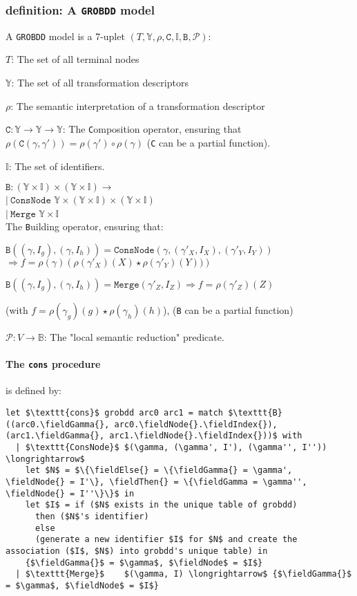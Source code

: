 \documentclass[a4paper,10pt]{article}
\newcommand{\B}{\mathbb{B}}
\newcommand{\Y}{\mathbb{Y}}
\newcommand{\I}{\mathbb{I}}
\newcommand{\GroBdd}{\texttt{GROBDD}}
\newcommand{\fieldIndex}{\texttt{index}}
\newcommand{\fieldNode}{\texttt{node}}
\newcommand{\fieldGamma}{\mathtt{\gamma}}
\newcommand{\fieldThen}{\mathtt{if1}}
\newcommand{\fieldElse}{\mathtt{if0}}
\begin{document}
\subsubsection{definition: A \GroBdd{} model}
{
A \GroBdd{} model is a 7-uplet $(T, \Y, \rho, \texttt{C}, \I, \texttt{B}, \mathcal{P})$:
\begin{compactenum}
\item $T$: The set of all terminal nodes
\item $\Y$: The set of all transformation descriptors
\item $\rho$: The semantic interpretation of a transformation descriptor
\item $\texttt{C}: \Y \longrightarrow \Y \longrightarrow \Y$: The \texttt{C}omposition operator, ensuring that $\rho(\texttt{C}(\gamma, \gamma')) = \rho(\gamma')\circ\rho(\gamma)$ (\texttt{C} can be a partial function).
\item $\I$: The set of identifiers.
\item $\mathtt{B}: (\Y\times\I)\times(\Y\times\I) \longrightarrow$\\
 $|~\texttt{ConsNode}$ $\Y\times (\Y\times\I) \times (\Y\times\I)$\\
 $|~\texttt{Merge}$ $\Y\times\I$\\
The \texttt{B}uilding operator, ensuring that:\begin{compactenum}
\item $\texttt{B}((\gamma, I_g), (\gamma, I_h))= \texttt{ConsNode} (\gamma, (\gamma'_X, I_X), (\gamma'_Y, I_Y))$\\$\Rightarrow f = \rho(\gamma)\left(\rho(\gamma'_X)(X) \star \rho(\gamma'_Y)(Y))\right)$
\item $\texttt{B}((\gamma, I_g), (\gamma, I_h))= \texttt{Merge} (\gamma'_Z, I_Z) \Rightarrow f = \rho(\gamma'_Z)(Z)$
\end{compactenum}
(with $f = \rho(\gamma_g)(g) \star \rho(\gamma_h)(h)$), (\texttt{B} can be a partial function)
\item $\mathcal{P}: V\longrightarrow\B$: The "local semantic reduction" predicate.
\end{compactenum}
}

\paragraph{The \texttt{cons} procedure} is defined by:
\begin{lstlisting}
let $\texttt{cons}$ grobdd arc0 arc1 = match $\texttt{B}((arc0.\fieldGamma{}, arc0.\fieldNode{}.\fieldIndex{}), (arc1.\fieldGamma{}, arc1.\fieldNode{}.\fieldIndex{}))$ with
  | $\texttt{ConsNode}$ $(\gamma, (\gamma', I'), (\gamma'', I'')) \longrightarrow$
    let $N$ = $\{\fieldElse{} = \{\fieldGamma{} = \gamma', \fieldNode{} = I'\}, \fieldThen{} = \{\fieldGamma = \gamma'', \fieldNode{} = I''\}\}$ in
    let $I$ = if ($N$ exists in the unique table of grobdd)
      then ($N$'s identifier)
      else
      (generate a new identifier $I$ for $N$ and create the association ($I$, $N$) into grobdd's unique table) in
    {$\fieldGamma{}$ = $\gamma$, $\fieldNode$ = $I$}
  | $\texttt{Merge}$    $(\gamma, I) \longrightarrow$ {$\fieldGamma{}$ = $\gamma$, $\fieldNode$ = $I$}
\end{lstlisting}
\end{document}
